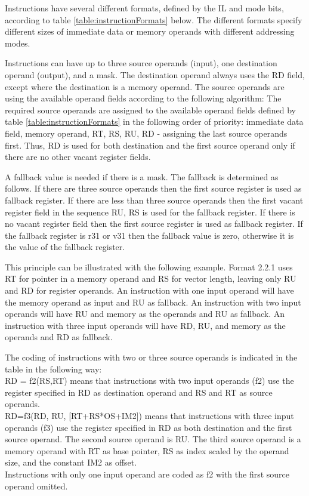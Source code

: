 \documentclass[forwardcom.tex]{subfiles}
\begin{document}
Instructions have several different formats, defined by the IL and mode bits, according to  table \ref{table:instructionFormats} below. The different formats specify different sizes of immediate data or memory operands with different addressing modes. \\
\vspace{2mm}

Instructions can have up to three source operands (input), one destination operand (output), and a mask. The destination operand always uses the RD field, except where the destination is a memory operand. The source operands are using the available operand fields according to the following algorithm: The required source operands are assigned to the available
operand fields defined by table \ref{table:instructionFormats} in the following order of 
priority: immediate data field, memory operand, RT, RS, RU, RD - assigning the last source operands first. Thus, RD is used for both destination and the first source operand only if there are no other vacant register fields.
\vspace{2mm}

A fallback value is needed if there is a mask. The fallback is determined as follows. If there are three source operands then the first source register is used as fallback register. If there are less than three source operands then the first vacant register field in the sequence RU, RS is used for the fallback register. If there is no vacant register field then the first source register is used as fallback register. If the fallback register is r31 or v31 then the fallback value is zero, otherwise it is the value of the fallback register.
\vspace{2mm}

This principle can be illustrated with the following example. Format 2.2.1 uses RT for pointer in a memory operand and RS for vector length, leaving only RU and RD for register operands. An instruction with one input operand will have the memory operand as input and RU as fallback. An instruction with two input operands will have RU and memory as the operands and RU as fallback. An instruction with three input operands will have RD, RU, and memory as the operands and RD as fallback.
\vspace{2mm}

The coding of instructions with two or three source operands is indicated in the table in the following way: \\
RD = f2(RS,RT)  means that instructions with two input operands (f2) use the register specified in RD as destination operand and RS and RT as source operands.\\
RD=f3(RD, RU, [RT+RS*OS+IM2])  means that instructions with three input operands (f3) use the register specified in RD as both destination and the first source operand. The second source operand is RU. The third source operand is a memory operand with RT as base pointer, RS as index scaled by the operand size, and the constant IM2 as offset.\\
Instructions with only one input operand are coded as f2 with the first source operand omitted.
\end{document}
